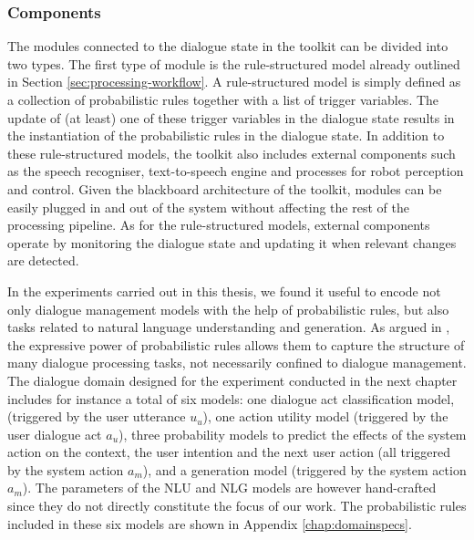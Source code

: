 \subsubsection*{Components}

The modules connected to the dialogue state in the \opendial{} toolkit can be divided into two types. The first type of module is the rule-structured model already outlined in Section \ref{sec:processing-workflow}.  A rule-structured model is simply defined as a collection of probabilistic rules together with a list of trigger variables.  The update of (at least) one of these trigger variables in the dialogue state results in the instantiation of the probabilistic rules in the dialogue state. In addition to these rule-structured models, the \opendial{} toolkit also includes external components such as the speech recogniser, text-to-speech engine and processes for robot perception and control. Given the blackboard architecture of the toolkit, modules can be easily plugged in and out of the system without affecting the rest of the processing pipeline. As for the rule-structured models, external components operate by monitoring the dialogue state and updating it when relevant changes are detected. 

In the experiments carried out in this thesis, we found it useful to encode not only dialogue management models with the help of probabilistic rules, but also tasks related to natural language understanding and generation. As argued in \cite{lison-semdial2012}, the expressive power of probabilistic rules allows them to capture the structure of many dialogue processing tasks, not necessarily confined to dialogue management. The dialogue domain designed for the experiment conducted in the next chapter includes for instance a total of six models: one dialogue act classification model, (triggered by the user utterance $u_u$), one action utility model (triggered by the user dialogue act $a_u$), three probability models to predict the effects of the system action on the context, the user intention and the next user action (all triggered by the system action $a_m$), and a generation model (triggered by the system action $a_m$).  The parameters of the NLU and NLG models are however hand-crafted since they do not directly constitute the focus of our work. The probabilistic rules included in these six models are shown in Appendix \ref{chap:domainspecs}.

